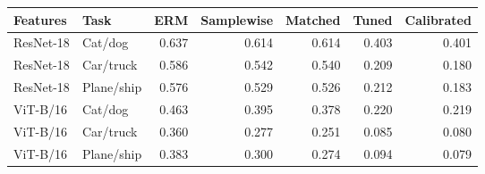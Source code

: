\begin{tabular}{llrrrrr}
\toprule
Features & Task & ERM & Samplewise & Matched & Tuned & Calibrated\\
\midrule
ResNet-18 & Cat/dog & 0.637 & 0.614 & 0.614 & 0.403 & 0.401\\
ResNet-18 & Car/truck & 0.586 & 0.542 & 0.540 & 0.209 & 0.180\\
ResNet-18 & Plane/ship & 0.576 & 0.529 & 0.526 & 0.212 & 0.183\\
ViT-B/16 & Cat/dog & 0.463 & 0.395 & 0.378 & 0.220 & 0.219\\
ViT-B/16 & Car/truck & 0.360 & 0.277 & 0.251 & 0.085 & 0.080\\
ViT-B/16 & Plane/ship & 0.383 & 0.300 & 0.274 & 0.094 & 0.079\\
\bottomrule
\end{tabular}